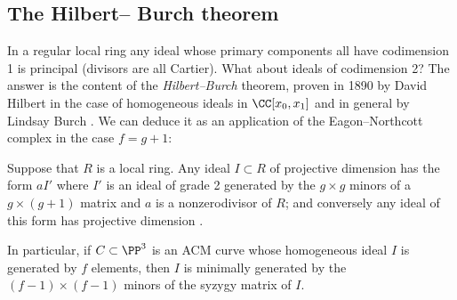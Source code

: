 \subsection*{The Hilbert--\kern-0.5pt Burch theorem}

\hskip-3pt
In a regular local ring any ideal whose primary components all have 
\null codimension\kern1.5pt 1 is 
principal (divisors are all Cartier). What about
ideals of codimension 2? The answer is the content of the
\emph{Hilbert--Burch} theorem, proven
in 1890 by David Hilbert in the case of homogeneous ideals in
%
%
$\CC[x_{0},x_{1}]$ and in general by
Lindsay Burch \citeyear{MR212008}. We can deduce it as an application of
the Eagon--Northcott complex
in the case $f =g+1$:

\begin{corollary}\label{Hilbert--Burch}
Suppose that $R$ is a local ring. Any ideal $I\subset R$ of projective
%
dimension \1 has the form
$aI'$ where $I'$ is an ideal of grade 2 generated by the $g\times g$
minors
of a $g \times (g+1)$ matrix and $a$ is a nonzerodivisor of $R$; and
conversely any ideal of this form
has projective dimension \1.

%
In particular, if $C\subset \PP^{3}$ is an 
ACM curve
%
whose homogeneous
ideal $I$ is generated by
$f$ elements, then $I$ is minimally generated by the $(f-1)\times (f-1)$
minors of the 
syzygy matrix
%
 of $I$.
\unif
\end{corollary}

